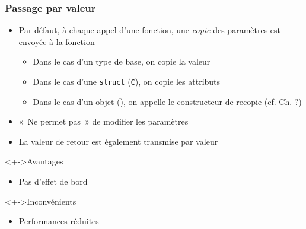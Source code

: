 \begin{frame}
\frametitle{Passage par valeur}
\begin{itemize}[<+->]
\item Par défaut, à chaque appel d'une fonction, une \emph{copie} des paramètres est envoyée à la fonction
	\begin{itemize}
	\item Dans le cas d'un type de base, on copie la valeur
	\item Dans le cas d'une \lstinline|struct| (\texttt{C}), on copie les attributs
	\item Dans le cas d'un objet (\cpp), on appelle le constructeur de recopie (cf. Ch. ?)
	\end{itemize}
\item «~Ne permet pas~» de modifier les paramètres
\item La valeur de retour est également transmise par valeur	
\end{itemize}
\begin{exampleblock}<+->{Avantages}
	\begin{itemize}[<+->]
	\item Pas d'effet de bord
	\end{itemize}
\end{exampleblock}
\begin{alertblock}<+->{Inconvénients}
	\begin{itemize}[<+->]
	\item Performances réduites
	\end{itemize}
\end{alertblock}
\end{frame}

